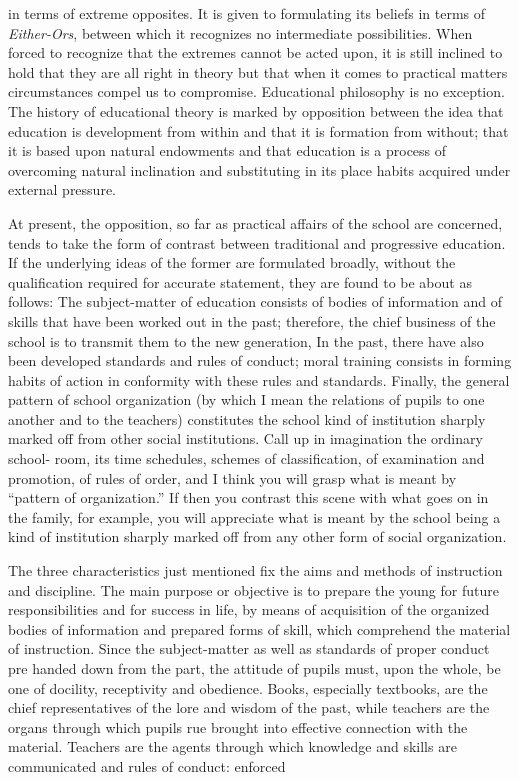 

 in terms of extreme opposites. It is given to formulating its 
beliefs in terms of \textit{Either-Ors}, between which it recognizes no intermediate possibilities. 
When forced to recognize that the extremes cannot be acted upon, it is still inclined to 
hold that they are all right in theory but that when it comes to practical matters 
circumstances compel us to compromise. Educational philosophy is no exception. The 
history of educational theory is marked by opposition between the idea that education is 
development from within and that it is formation from without; that it is based upon 
natural endowments and that education is a process of overcoming natural inclination and 
substituting in its place habits acquired under external pressure. 

At present, the opposition, so far as practical affairs of the school are concerned, tends 
to take the form of contrast between traditional and progressive education. If the 
underlying ideas of the former are formulated broadly, without the qualification required 
for accurate statement, they are found to be about as follows: The subject-matter of 
education consists of bodies of information and of skills that have been worked out in the 
past; therefore, the chief business of the school is to transmit them to the new generation, 
In the past, there have also been developed standards and rules of conduct; moral training 
consists in forming habits of action in conformity with these rules and standards. Finally, 
the general pattern of school organization (by which I mean the relations of pupils to one 
another and to the teachers) constitutes the school kind of institution sharply marked off 
from other social institutions. Call up in imagination the ordinary school- room, its time 
schedules, schemes of classification, of examination and promotion, of rules of order, and 
I think you will grasp what is meant by \enquote{pattern of organization.} If then you contrast this 
scene with what goes on in the family, for example, you will appreciate what is meant by 
the school being a kind of institution sharply marked off from any other form of social 
organization. 

The three characteristics just mentioned fix the aims and methods of instruction and 
discipline. The main purpose or objective is to prepare the young for future 
responsibilities and for success in life, by means of acquisition of the organized bodies of 
information and prepared forms of skill, which comprehend the material of instruction. 
Since the subject-matter as well as standards of proper conduct pre handed down from the 
part, the attitude of pupils must, upon the whole, be one of docility, receptivity and 
obedience. Books, especially textbooks, are the chief representatives of the lore and 
wisdom of the past, while teachers are the organs through which pupils rue brought into 
effective connection with the material. Teachers are the agents through which knowledge 
and skills are communicated and rules of conduct: enforced 

